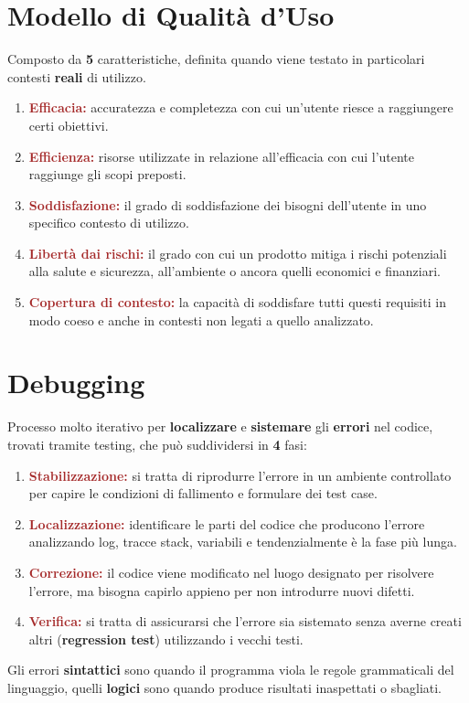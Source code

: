 \section{Modello di Qualità d'Uso}
Composto da \textbf{5} caratteristiche, definita quando viene testato in particolari contesti \textbf{reali} di utilizzo.
\begin{enumerate}
    \item \textbf{\textcolor{brown}{Efficacia:}} accuratezza e completezza con cui un'utente riesce a raggiungere certi obiettivi.
    \item \textbf{\textcolor{brown}{Efficienza:}} risorse utilizzate in relazione all'efficacia con cui l'utente raggiunge gli scopi preposti.
    \item \textbf{\textcolor{brown}{Soddisfazione:}} il grado di soddisfazione dei bisogni dell'utente in uno specifico contesto di utilizzo.
    \item \textbf{\textcolor{brown}{Libertà dai rischi:}} il grado con cui un prodotto mitiga i rischi potenziali alla salute e sicurezza, all'ambiente o ancora quelli economici e finanziari.
    \item \textbf{\textcolor{brown}{Copertura di contesto:}} la capacità di soddisfare tutti questi requisiti in modo coeso e anche in contesti non legati a quello analizzato.
\end{enumerate}

\section{Debugging}
Processo molto iterativo per \textbf{localizzare} e \textbf{sistemare} gli \textbf{errori} nel codice, trovati tramite testing, che può suddividersi in \textbf{4} fasi:
\begin{enumerate}
    \item \textbf{\textcolor{brown}{Stabilizzazione:}} si tratta di riprodurre l'errore in un ambiente controllato per capire le condizioni di fallimento e formulare dei test case.
    \item \textbf{\textcolor{brown}{Localizzazione:}} identificare le parti del codice che producono l'errore analizzando log, tracce stack, variabili e tendenzialmente è la fase più lunga.
    \item \textbf{\textcolor{brown}{Correzione:}} il codice viene modificato nel luogo designato per risolvere l'errore, ma bisogna capirlo appieno per non introdurre nuovi difetti.
    \item \textbf{\textcolor{brown}{Verifica:}} si tratta di assicurarsi che l'errore sia sistemato senza averne creati altri (\textbf{regression test}) utilizzando i vecchi testi.
\end{enumerate}
Gli errori \textbf{sintattici} sono quando il programma viola le regole grammaticali del linguaggio, quelli \textbf{logici} sono quando produce risultati inaspettati o sbagliati.

